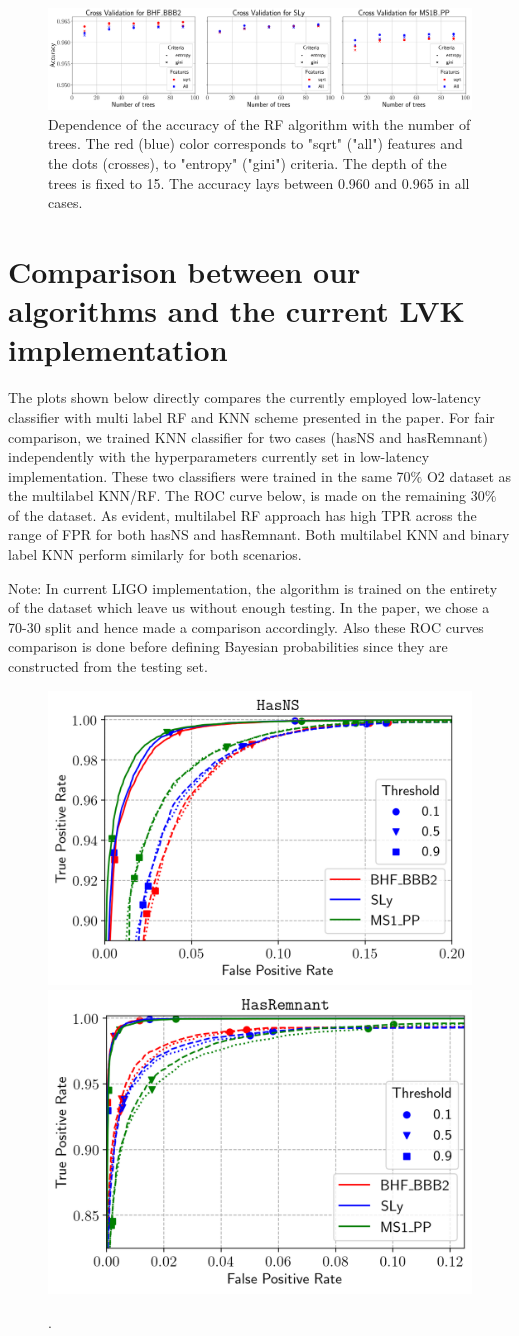 \begin{figure}%
\includegraphics[width=\linewidth]{cross_val_RF}
\caption{Dependence of the accuracy of the RF algorithm with the number of trees. The red (blue) color corresponds to "sqrt" ("all") features and the dots (crosses), to "entropy" ("gini") criteria.  The depth of the trees is fixed to 15.  The accuracy lays between 0.960 and 0.965 in all cases.}
\label{fig:crossvalRF}
\end{figure}

\section{Comparison between our algorithms and the current LVK implementation}  \label{app:comparison}


The plots shown below directly compares the currently employed low-latency classifier  with multi label RF and KNN scheme presented in the paper. For fair comparison, we trained KNN classifier for two cases (hasNS and hasRemnant) independently with the hyperparameters currently set in low-latency implementation. These two classifiers were trained in the same 70$\%$ O2 dataset as the multilabel KNN/RF. The ROC curve below, is made on the remaining 30$\%$ of the dataset. As evident, multilabel RF approach has high TPR across the range of FPR for both hasNS and hasRemnant. Both multilabel KNN and binary label KNN perform similarly for both scenarios.

Note: In current LIGO implementation, the algorithm is trained on the entirety of the dataset which leave us without enough testing. In the paper, we chose a 70-30 split and hence made a comparison accordingly. Also these ROC curves comparison is done before defining Bayesian probabilities since they are constructed from the testing set.

\begin{figure}%
\includegraphics[width=0.47\linewidth]{ROC_O2testing_all_impl-NS}
\includegraphics[width=0.45\linewidth]{ROC_O2testing_all_impl-REM}
\caption{.}
\label{fig:rocO2_all}
\end{figure}




